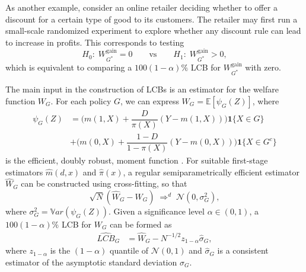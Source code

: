 \documentclass[12pt]{article}
\numberwithin{equation}{section}
\theoremstyle{plain}                         %
\theoremstyle{definition}                  %
\theoremstyle{remark}                      %
\newcommand{\E}{\mathbb{E}}
\newcommand{\Var}{\mathbb{V}ar}
\begin{document}
As another example, consider an online retailer deciding whether to offer a discount for a certain type of good to its customers. The retailer may first run a small-scale randomized experiment to explore whether any discount rule can lead to increase in profits. This corresponds to testing 
\[
H_0:\; W_{G^*}^{\text{gain}} = 0
\qquad\text{vs}\qquad
H_1:\; W_{G^*}^{\text{gain}} > 0,
\]
which is equivalent to comparing a \(100(1-\alpha)\%\) LCB for \(W_{G^*}^{\text{gain}}\) with zero.

The main input in the construction of LCBs is an estimator for the welfare function $W_G$. For each policy $G$, we can express $W_G = \E[\psi_G(Z)]$, where 
\begin{align}
\label{eq:dr}
\psi_G(Z) &= \bigg(m(1,X) + \dfrac{D}{\pi(X)} (Y - m(1,X)) \bigg)  \bm{1}\{ X \in G \} \\[2mm] 
&+ \bigg(m(0,X) +  \dfrac{1-D}{1-\pi(X)} (Y - m(0,X)) \bigg) \bm{1}\{ X \in G^c \} \nonumber
\end{align}
is the efficient, doubly robust, moment function \cite{Robins, Hahn98}. For suitable first-stage estimators $\widehat{m}(d, x)$ and $\widehat{\pi}(x)$, a regular semiparametrically efficient estimator $\widehat{W}_G$ can be constructed using cross-fitting, so that
\begin{equation} \label{eq:wg_asymp}
  \sqrt N(\widehat W_G - W_G) \;\Rightarrow^d \; \mathcal{N}(0, \sigma_G^2),
\end{equation}
where $\sigma_G^2 = \Var(\psi_G(Z))$. Given a significance level $\alpha \in (0,1)$, a $100(1-\alpha) \%$ LCB for $W_G$ can be formed as
 \begin{align}
\widehat{LCB}_{G} &= \widehat{W}_{G} - N^{-1/2} z_{1-\alpha} \widehat{\sigma}_{G},  \label{eq:lcbg} 
\end{align}
where  $z_{1-\alpha}$ is the $(1-\alpha)$ quantile of $\mathcal{N}(0,1)$ and $ \widehat{\sigma}_{G}$ is a consistent estimator of the asymptotic standard deviation $\sigma_G$. 
\end{document}
